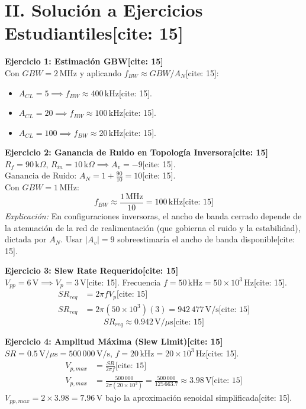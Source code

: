 \documentclass[11pt, a4paper]{article}
\begin{document}
\section*{II. Solución a Ejercicios Estudiantiles[cite: 15]}

\textbf{Ejercicio 1: Estimación GBW[cite: 15]} \\
Con $GBW = 2\,\text{MHz}$ y aplicando $f_{BW} \approx GBW / A_N$[cite: 15]:
\begin{itemize}
    \item $A_{CL} = 5 \implies f_{BW} \approx 400\,\text{kHz}$[cite: 15].
    \item $A_{CL} = 20 \implies f_{BW} \approx 100\,\text{kHz}$[cite: 15].
    \item $A_{CL} = 100 \implies f_{BW} \approx 20\,\text{kHz}$[cite: 15].
\end{itemize}

\textbf{Ejercicio 2: Ganancia de Ruido en Topología Inversora[cite: 15]} \\
$R_f = 90\,\text{k}\Omega$, $R_{in} = 10\,\text{k}\Omega \implies A_v = -9$[cite: 15]. \\
Ganancia de Ruido: $A_N = 1 + \frac{90}{10} = 10$[cite: 15]. \\
Con $GBW = 1\,\text{MHz}$:
\begin{equation*}
    f_{BW} \approx \frac{1\,\text{MHz}}{10} = \boxed{100\,\text{kHz}} \text{[cite: 15]}
\end{equation*}
\textit{Explicación:} En configuraciones inversoras, el ancho de banda cerrado depende de la atenuación de la red de realimentación (que gobierna el ruido y la estabilidad), dictada por $A_N$. Usar $|A_v|=9$ sobreestimaría el ancho de banda disponible[cite: 15].

\textbf{Ejercicio 3: Slew Rate Requerido[cite: 15]} \\
$V_{pp} = 6\,\text{V} \implies V_p = 3\,\text{V}$[cite: 15]. Frecuencia $f = 50\,\text{kHz} = 50 \times 10^3\,\text{Hz}$[cite: 15].
\begin{align*}
    SR_{req} &= 2\pi f V_p \text{[cite: 15]} \\
    SR_{req} &= 2\pi(50 \times 10^3)(3) = 942\,477\,\text{V/s} \text{[cite: 15]}
\end{align*}
\begin{equation*}
    \boxed{SR_{req} \approx 0.942\,\text{V}/\mu\text{s}} \text{[cite: 15]}
\end{equation*}

\textbf{Ejercicio 4: Amplitud Máxima (Slew Limit)[cite: 15]} \\
$SR = 0.5\,\text{V}/\mu\text{s} = 500\,000\,\text{V/s}$, $f = 20\,\text{kHz} = 20 \times 10^3\,\text{Hz}$[cite: 15].
\begin{align*}
    V_{p,max} &= \frac{SR}{2\pi f} \text{[cite: 15]} \\
    V_{p,max} &= \frac{500\,000}{2\pi(20 \times 10^3)} = \frac{500\,000}{125\,663.7} \approx \boxed{3.98\,\text{V}} \text{[cite: 15]}
\end{align*}
$V_{pp,max} = 2 \times 3.98 = \boxed{7.96\,\text{V}}$ bajo la aproximación senoidal simplificada[cite: 15].
\end{document}
